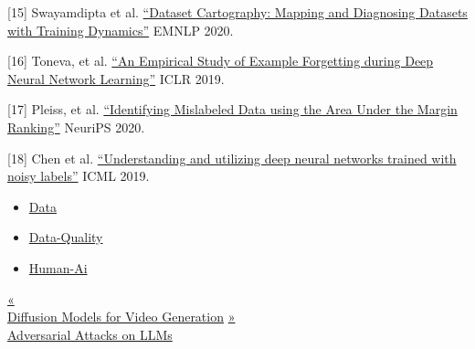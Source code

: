 {[}15{]} Swayamdipta et al. \href{https://arxiv.org/abs/2009.10795}{``Dataset Cartography: Mapping and Diagnosing Datasets with Training Dynamics''} EMNLP 2020.

{[}16{]} Toneva, et al. \href{https://arxiv.org/abs/1812.05159}{``An Empirical Study of Example Forgetting during Deep Neural Network Learning''} ICLR 2019.

{[}17{]} Pleiss, et al. \href{https://arxiv.org/abs/2001.10528}{``Identifying Mislabeled Data using the Area Under the Margin Ranking''} NeuriPS 2020.

{[}18{]} Chen et al. \href{https://arxiv.org/abs/1905.05040}{``Understanding and utilizing deep neural networks trained with noisy labels''} ICML 2019.

\begin{itemize}
\tightlist
\item
  \href{https://lilianweng.github.io/tags/data/}{Data}
\item
  \href{https://lilianweng.github.io/tags/data-quality/}{Data-Quality}
\item
  \href{https://lilianweng.github.io/tags/human-ai/}{Human-Ai}
\end{itemize}

\href{https://lilianweng.github.io/posts/2024-04-12-diffusion-video/}{{« }\\
{Diffusion Models for Video Generation}} \href{https://lilianweng.github.io/posts/2023-10-25-adv-attack-llm/}{{ »}\\
{Adversarial Attacks on LLMs}}

